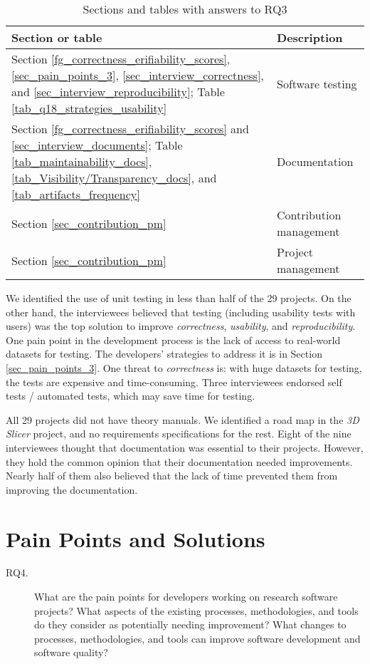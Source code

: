 \begin{table}[H]
\centering
\begin{tabular}{ll}
\hline
Section or table & Description \\ \hline
Section \ref{fg_correctness_erifiability_scores}, \ref{sec_pain_points_3}, \ref{sec_interview_correctness}, and \ref{sec_interview_reproducibility}; Table \ref{tab_q18_strategies_usability} & Software testing \\
Section \ref{fg_correctness_erifiability_scores} and \ref{sec_interview_documents}; Table \ref{tab_maintainability_docs}, \ref{tab_Visibility/Transparency_docs}, and \ref{tab_artifacts_frequency} & Documentation \\
Section \ref{sec_contribution_pm} & Contribution management \\
Section \ref{sec_contribution_pm} & Project management \\ \hline
\end{tabular}
\caption{\label{tab_reference_rq3}Sections and tables with answers to RQ3}
\end{table}

We identified the use of unit testing in less than half of the 29 projects. On the other hand, the interviewees believed that testing (including usability tests with users) was the top solution to improve \textit{correctness}, \textit{usability}, and \textit{reproducibility}. One pain point in the development process is the lack of access to real-world datasets for testing. The developers' strategies to address it is in Section \ref{sec_pain_points_3}. One threat to \textit{correctness} is: with huge datasets for testing, the tests are expensive and time-consuming. Three interviewees endorsed self tests / automated tests, which may save time for testing.

All 29 projects did not have theory manuals. We identified a road map in the \textit{3D Slicer} project, and no requirements specifications for the rest. Eight of the nine interviewees thought that documentation was essential to their projects. However, they hold the common opinion that their documentation needed improvements. Nearly half of them also believed that the lack of time prevented them from improving the documentation.

\section{Pain Points and Solutions}
\label{sec_rq_pain_points}
\begin{description}
\item[RQ4.] What are the pain points for developers working on research software projects? What aspects of the existing processes, methodologies, and tools do they consider as potentially needing improvement? What changes to processes, methodologies, and tools can improve software development and software quality?
\end{description}

